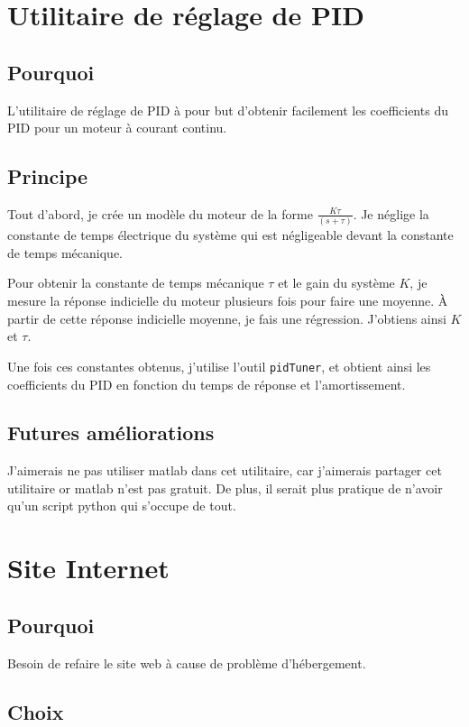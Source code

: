 \documentclass[11pt,a4paper]{report}
\begin{document}
  \section{Utilitaire de réglage de PID}
    \subsection{Pourquoi}
      L'utilitaire de réglage de PID à pour but d'obtenir facilement les coefficients du PID pour un moteur à courant continu.

    \subsection{Principe}
      Tout d'abord, je crée un modèle du moteur de la forme \(\frac{K\tau}{(s+\tau)}\). Je néglige la constante de temps électrique du système qui est négligeable devant la constante de temps mécanique.

      Pour obtenir la constante de temps mécanique \(\tau \) et le gain du système \(K\), je mesure la réponse indicielle du moteur plusieurs fois pour faire une moyenne. À partir de cette réponse indicielle moyenne, je fais une régression. J'obtiens ainsi \(K\) et \(\tau \).

      Une fois ces constantes obtenus, j'utilise l'outil \texttt{pidTuner}, et obtient ainsi les coefficients du PID en fonction du temps de réponse et l'amortissement.

    \subsection{Futures améliorations}
      J'aimerais ne pas utiliser matlab dans cet utilitaire, car j'aimerais partager cet utilitaire or matlab n'est pas gratuit.
      De plus, il serait plus pratique de n'avoir qu'un script python qui s'occupe de tout.

  \section{Site Internet}
    \subsection{Pourquoi}
      Besoin de refaire le site web à cause de problème d'hébergement.

    \subsection{Choix}
\end{document}
